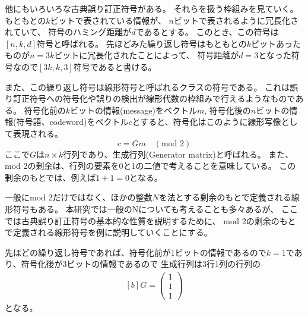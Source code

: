 \documentclass[../master.tex]{subfiles}
\begin{document}
\bigskip
他にもいろいろな古典誤り訂正符号がある。
それらを扱う枠組みを見ていく。
もともとの\(k\)ビットで表されている情報が、
\(n\)ビットで表されるように冗長化されていて、
符号のハミング距離が\(d\)であるとする。
このとき、この符号は\([n,k,d]\)符号と呼ばれる。
先ほどみた繰り返し符号はもともとの\(k\)ビットあったものが\(n=3k\)ビットに冗長化されたことによって、
符号距離が\(d=3\)となった符号なので\([3k,k,3]\)符号であると書ける。

また、この繰り返し符号は線形符号と呼ばれるクラスの符号である。
これは誤り訂正符号への符号化や誤りの検出が線形代数の枠組みで行えるようなものである。
符号化前の\(k\)ビットの情報(message)をベクトル\(m\),
符号化後の\(n\)ビットの情報(符号語、codeword)をベクトル\(c\)とすると、符号化はこのように線形写像として表現される。
\begin{equation}
    c = Gm \quad (\text{mod } 2)
\end{equation}
ここで\(G\)は\(n\times k\)行列であり、生成行列(Generator matrix)と呼ばれる。
また、mod 2の剰余は、行列の要素を0と1の二値で考えることを意味している。
この剰余のもとでは、例えば\(1+1=0\)となる。

一般にmod 2だけではなく、ほかの整数\(N\)を法とする剰余のもとで定義される線形符号もある。
本研究では一般のNについても考えることも多々あるが、
ここでは古典誤り訂正符号の基本的な性質を説明するために、
mod 2の剰余のもとで定義される線形符号を例に説明していくことにする。

先ほどの繰り返し符号であれば、符号化前が1ビットの情報であるので\(k=1\)であり、符号化後が3ビットの情報であるので
生成行列は3行1列の行列の
\begin{equation}\begin{aligned}[b]
    G = \begin{pmatrix}
        1\\1\\1
    \end{pmatrix}
\end{aligned}\end{equation}
となる。
\end{document}

